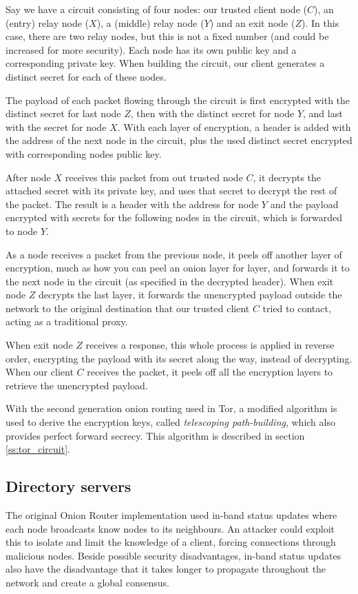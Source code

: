 \documentclass[journal]{IEEEtran}
\begin{document}
		Say we have a circuit consisting of four nodes: our trusted client node ($C$), an (entry) relay node ($X$), a (middle) relay node ($Y$) and an exit node ($Z$). In this case, there are two relay nodes, but this is not a fixed number (and could be increased for more security). Each node has its own public key and a corresponding private key. When building the circuit, our client generates a distinct secret for each of these nodes.
					
		The payload of each packet flowing through the circuit is first encrypted with the distinct secret for last node $Z$, then with the distinct secret for node $Y$, and last with the secret for node $X$. With each layer of encryption, a header is added with the address of the next node in the circuit, plus the used distinct secret encrypted with corresponding nodes public key. 
					
		After node $X$ receives this packet from out trusted node $C$, it decrypts the attached secret with its private key, and uses that secret to decrypt the rest of the packet. The result is a header with the address for node $Y$ and the payload encrypted with secrets for the following nodes in the circuit, which is forwarded to node $Y$.
					
		As a node receives a packet from the previous node, it peels off another layer of encryption, much as how you can peel an onion layer for layer, and forwards it to the next node in the circuit (as specified in the decrypted header). When exit node $Z$ decrypts the last layer, it forwards the unencrypted payload outside the network to the original destination that our trusted client $C$ tried to contact, acting as a traditional proxy.
					
		When exit node $Z$ receives a response, this whole process is applied in reverse order, encrypting the payload with its secret along the way, instead of decrypting. When our client $C$ receives the packet, it peels off all the encryption layers to retrieve the unencrypted payload.
		
		With the second generation onion routing used in Tor, a modified algorithm is used to derive the encryption keys, called \emph{telescoping path-building}, which also provides perfect forward secrecy. This algorithm is described in section \ref{ss:tor_circuit}.
				
	\subsection{Directory servers}
		The original Onion Router implementation used in-band status updates where each node broadcasts know nodes to its neighbours. An attacker could exploit this to isolate and limit the knowledge of a client, forcing connections through malicious nodes. Beside possible security disadvantages, in-band status updates also have the disadvantage that it takes longer to propagate throughout the network and create a global consensus.
					
\end{document}
